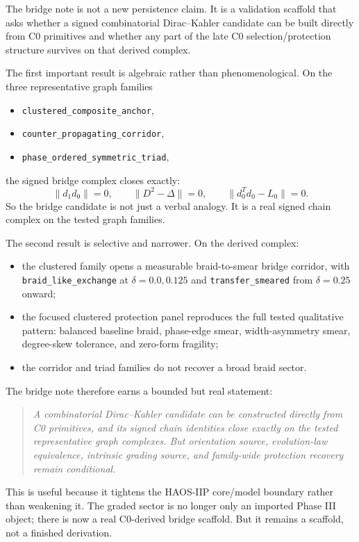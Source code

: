 \documentclass[11pt]{article}
\begin{document}
The bridge note is not a new persistence claim. It is a validation scaffold that asks whether a signed combinatorial Dirac--Kahler candidate can be built directly from C0 primitives and whether any part of the late C0 selection/protection structure survives on that derived complex.

The first important result is algebraic rather than phenomenological. On the three representative graph families
\begin{itemize}
\item \texttt{clustered\_composite\_anchor},
\item \texttt{counter\_propagating\_corridor},
\item \texttt{phase\_ordered\_symmetric\_triad},
\end{itemize}
the signed bridge complex closes exactly:
\[
\|d_1 d_0\| = 0, \qquad \|D^2 - \Delta\| = 0, \qquad \|d_0^{T} d_0 - L_0\| = 0.
\]
So the bridge candidate is not just a verbal analogy. It is a real signed chain complex on the tested graph families.

The second result is selective and narrower. On the derived complex:
\begin{itemize}
\item the clustered family opens a measurable braid-to-smear bridge corridor, with \texttt{braid\_like\_exchange} at $\delta = 0.0, 0.125$ and \texttt{transfer\_smeared} from $\delta = 0.25$ onward;
\item the focused clustered protection panel reproduces the full tested qualitative pattern: balanced baseline braid, phase-edge smear, width-asymmetry smear, degree-skew tolerance, and zero-form fragility;
\item the corridor and triad families do not recover a broad braid sector.
\end{itemize}

The bridge note therefore earns a bounded but real statement:
\begin{quote}
\emph{A combinatorial Dirac--Kahler candidate can be constructed directly from C0 primitives, and its signed chain identities close exactly on the tested representative graph complexes. But orientation source, evolution-law equivalence, intrinsic grading source, and family-wide protection recovery remain conditional.}
\end{quote}

This is useful because it tightens the HAOS-IIP core/model boundary rather than weakening it. The graded sector is no longer only an imported Phase III object; there is now a real C0-derived bridge scaffold. But it remains a scaffold, not a finished derivation.
\end{document}
